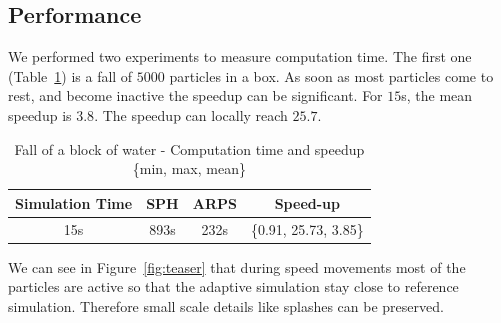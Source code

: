 \subsection{Performance}
We performed two experiments to measure computation time.
The first one (Table~\ref{table:perf1}) is a fall of $5000$ particles in a box.
As soon as most particles come to rest, and become inactive the speedup can be significant.
For $15$s, the mean speedup is $3.8$.
The speedup can locally reach $25.7$.
\begin{table}[htb]
   \centering
\begin{tabular}{|c|c|c|c|} \hline
    Simulation Time & SPH   & ARPS    & Speed-up \\ \hline
    15s     & 893s   & 232s                 &  \{0.91, 25.73, 3.85\}\\ \hline
\end{tabular}
\caption[ARPS: Fall of a block of water - Measurements]{\label{table:perf1}Fall of a block of water - Computation time and speedup \{min, max, mean\}}
\end{table}
We can see in Figure~\ref{fig:teaser} that during speed movements most of the particles are active so that the adaptive simulation stay close to reference simulation.
Therefore small scale details like splashes can be preserved.
